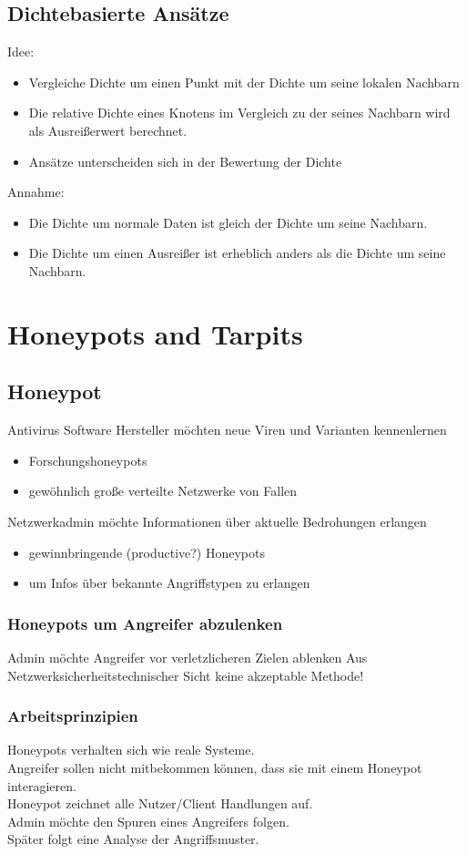 \documentclass{article} %
\begin{document}
\subsection{Dichtebasierte Ansätze}
Idee:
\begin{itemize}
	\item Vergleiche Dichte um einen Punkt mit der Dichte um seine lokalen Nachbarn
    \item Die relative Dichte eines Knotens im Vergleich zu der seines Nachbarn wird als Ausreißerwert berechnet.
    \item Ansätze unterscheiden sich in der Bewertung der Dichte
\end{itemize}
Annahme:
\begin{itemize}
	\item Die Dichte um normale Daten ist gleich der Dichte um seine Nachbarn.
    \item Die Dichte um einen Ausreißer ist erheblich anders als die Dichte um seine Nachbarn.
\end{itemize}
\section{Honeypots and Tarpits}

\subsection{Honeypot}
Antivirus Software Hersteller möchten neue Viren und Varianten kennenlernen
\begin{itemize}
	\item Forschungshoneypots
    \item gewöhnlich große verteilte Netzwerke von Fallen
\end{itemize}
Netzwerkadmin möchte Informationen über aktuelle Bedrohungen erlangen
\begin{itemize}
	\item gewinnbringende (productive?) Honeypots
    \item um Infos über bekannte Angriffstypen zu erlangen
\end{itemize}
\subsubsection{Honeypots um Angreifer abzulenken}
Admin möchte Angreifer vor verletzlicheren Zielen ablenken
Aus Netzwerksicherheitstechnischer Sicht keine akzeptable Methode!
\subsubsection{Arbeitsprinzipien}
Honeypots verhalten sich wie reale Systeme.\\
Angreifer sollen nicht mitbekommen können, dass sie mit einem Honeypot interagieren.\\
Honeypot zeichnet alle Nutzer/Client Handlungen auf.\\
Admin möchte den Spuren eines Angreifers folgen.\\
Später folgt eine Analyse der Angriffsmuster.
\end{document}
